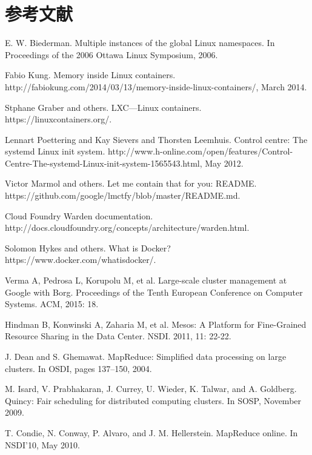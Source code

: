 \documentclass[UTF8,a4paper]{ctexart}
\begin{document}
\section{参考文献}
\begin{thebibliography}{0}
    E. W. Biederman. Multiple instances of the global Linux namespaces. In Proceedings of the 2006 Ottawa Linux Symposium, 2006.

    Fabio Kung. Memory inside Linux containers. \\http://fabiokung.com/2014/03/13/memory-inside-linux-containers/, March 2014.

    Stphane Graber and others. LXC—Linux containers. https://linuxcontainers.org/.

    Lennart Poettering and Kay Sievers and Thorsten Leemhuis. Control centre: The systemd Linux init system. http://www.h-online.com/open/features/Control-Centre-The-systemd-Linux-init-system-1565543.html, May 2012.

    Victor Marmol and others. Let me contain that for you: README. \\https://github.com/google/lmctfy/blob/master/README.md.

    Cloud Foundry Warden documentation. \\http://docs.cloudfoundry.org/concepts/architecture/warden.html.

    Solomon Hykes and others. What is Docker? https://www.docker.com/whatisdocker/.

    Verma A, Pedrosa L, Korupolu M, et al. Large-scale cluster management at Google with Borg. Proceedings of the Tenth European Conference on Computer Systems. ACM, 2015: 18.

    Hindman B, Konwinski A, Zaharia M, et al. Mesos: A Platform for Fine-Grained Resource Sharing in the Data Center. NSDI. 2011, 11: 22-22.

    J. Dean and S. Ghemawat. MapReduce: Simplified data processing on large clusters. In OSDI, pages 137–150, 2004.

    M. Isard, V. Prabhakaran, J. Currey, U. Wieder, K. Talwar, and A. Goldberg. Quincy: Fair scheduling for distributed computing clusters. In SOSP, November 2009.

    T. Condie, N. Conway, P. Alvaro, and J. M. Hellerstein. MapReduce online. In NSDI’10, May 2010.


\end{thebibliography}
\end{document}
